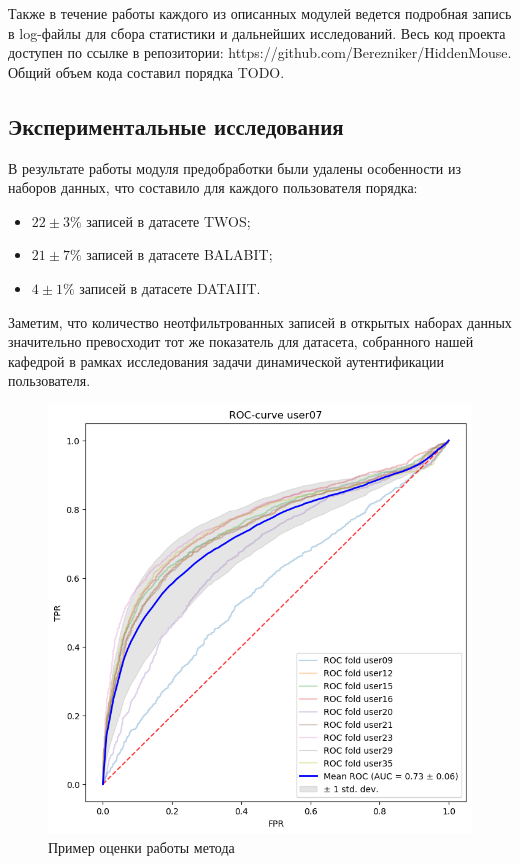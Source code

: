 \documentclass[12pt]{article}
\begin{document}
    \par Также в течение работы каждого из описанных модулей ведется подробная запись в log-файлы для сбора статистики и дальнейших исследований. Весь код проекта доступен по ссылке в репозитории: https://github.com/Berezniker/HiddenMouse. Общий объем кода составил порядка TODO.


    \subsection{Экспериментальные исследования}
    \label{sec:PracticalPart:ExperimentalStudy}

    \par В результате работы модуля предобработки были удалены особенности из наборов данных, что составило для каждого пользователя порядка:

    \begin{itemize}
        \item $ 22 \pm 3 \% $ записей в датасете TWOS;
        \item $ 21 \pm 7 \% $ записей в датасете BALABIT; 
        \item $  4 \pm 1 \% $ записей в датасете DATAIIT.
    \end{itemize}

    \par Заметим, что количество неотфильтрованных записей в открытых наборах данных значительно превосходит тот же показатель для датасета, собранного нашей кафедрой в рамках исследования задачи динамической аутентификации пользователя.

    \begin{figure}[h]
        \centering
        \includegraphics[width=0.85\linewidth]{ROC_curve.png}
        \caption{Пример оценки работы метода}
        \label{sec:PracticalPart:Software:fig:ROC_curve}
    \end{figure}
\end{document}
